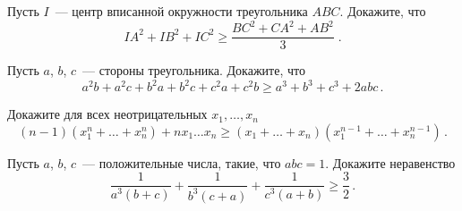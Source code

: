 \begin{problems}
\item
Пусть $I$~--- центр вписанной окружности треугольника $ABC$.
Докажите, что
\[
    IA^2 + IB^2 + IC^2
\geq
    \frac{BC^2 + CA^2 + AB^2}{3}
\; . \]

\item
Пусть $a$, $b$, $c$~--- стороны треугольника.
Докажите, что
\[
    a^2 b + a^2 c + b^2 a + b^2 c + c^2 a + c^2 b
\geq
    a^3 + b^3 + c^3 + 2 a b c
\, . \]

\item
Докажите для всех неотрицательных $x_1, \ldots, x_n$
\[
    (n - 1) (x_1^n + \ldots + x_n^n) + n x_1 \ldots x_n
\geq
    (x_1 + \ldots + x_n) (x_1^{n-1} + \ldots + x_n^{n-1})
\, . \]

\item
Пусть $a$, $b$, $c$~--- положительные числа, такие, что $a b c = 1$.
Докажите неравенство
\[
    \frac{1}{a^3 (b + c)} +
    \frac{1}{b^3 (c + a)} +
    \frac{1}{c^3 (a + b)}
\geq
    \frac{3}{2}
\, . \]

\end{problems}

